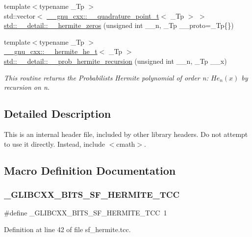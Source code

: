 \begin{DoxyCompactItemize}
{\footnotesize template$<$typename \+\_\+\+Tp $>$ }\\std\+::vector$<$ \hyperlink{struct____gnu__cxx_1_1____quadrature__point__t}{\+\_\+\+\_\+gnu\+\_\+cxx\+::\+\_\+\+\_\+quadrature\+\_\+point\+\_\+t}$<$ \+\_\+\+Tp $>$ $>$ \hyperlink{namespacestd_1_1____detail_a34e064cf8ddf0680ce559ba3f976c6dd}{std\+::\+\_\+\+\_\+detail\+::\+\_\+\+\_\+hermite\+\_\+zeros} (unsigned int \+\_\+\+\_\+n, \+\_\+\+Tp \+\_\+\+\_\+proto=\+\_\+\+Tp\{\})
\item 
{\footnotesize template$<$typename \+\_\+\+Tp $>$ }\\\hyperlink{struct____gnu__cxx_1_1____hermite__he__t}{\+\_\+\+\_\+gnu\+\_\+cxx\+::\+\_\+\+\_\+hermite\+\_\+he\+\_\+t}$<$ \+\_\+\+Tp $>$ \hyperlink{namespacestd_1_1____detail_aada7dabf929dbb464ef559feddf0ddc9}{std\+::\+\_\+\+\_\+detail\+::\+\_\+\+\_\+prob\+\_\+hermite\+\_\+recursion} (unsigned int \+\_\+\+\_\+n, \+\_\+\+Tp \+\_\+\+\_\+x)
\begin{DoxyCompactList}\small\item\em This routine returns the Probabilists Hermite polynomial of order n\+: $ He_n(x) $ by recursion on n. \end{DoxyCompactList}\end{DoxyCompactItemize}


\subsection{Detailed Description}
This is an internal header file, included by other library headers. Do not attempt to use it directly. Instead, include $<$cmath$>$. 

\subsection{Macro Definition Documentation}
\mbox{\label{sf__hermite_8tcc_a0f8ec646afa7a1f2821820df783ca594}} 
\subsubsection{\texorpdfstring{\+\_\+\+G\+L\+I\+B\+C\+X\+X\+\_\+\+B\+I\+T\+S\+\_\+\+S\+F\+\_\+\+H\+E\+R\+M\+I\+T\+E\+\_\+\+T\+CC}{\_GLIBCXX\_BITS\_SF\_HERMITE\_TCC}}
{\footnotesize\ttfamily \#define \+\_\+\+G\+L\+I\+B\+C\+X\+X\+\_\+\+B\+I\+T\+S\+\_\+\+S\+F\+\_\+\+H\+E\+R\+M\+I\+T\+E\+\_\+\+T\+CC~1}



Definition at line 42 of file sf\+\_\+hermite.\+tcc.

